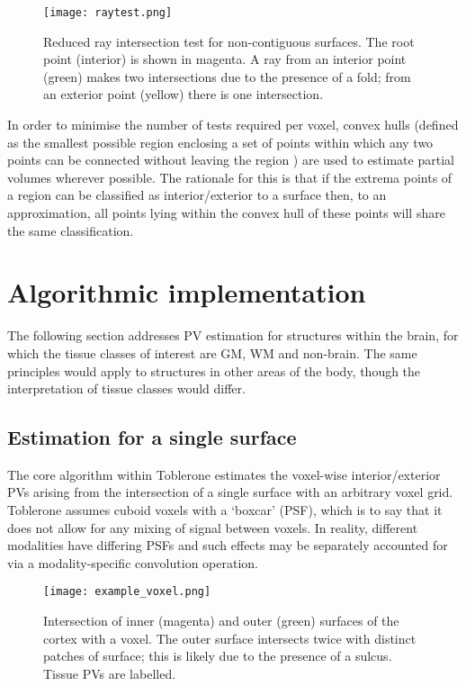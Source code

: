 \begin{figure}
\centering
\texttt{[image: raytest.png]}
\caption{Reduced ray intersection test for non-contiguous surfaces. The root point (interior) is shown in magenta. A ray from an interior point (green) makes two intersections due to the presence of a fold; from an exterior point (yellow) there is one intersection.}
\label{raytest}
\end{figure}

In order to minimise the number of tests required per voxel, convex hulls (defined as the smallest possible region enclosing a set of points within which any two points can be connected without leaving the region \cite{DeBerg2008}) are used to estimate partial volumes wherever possible. The rationale for this is that if the extrema points of a region can be classified as interior/exterior to a surface then, to an approximation, all points lying within the convex hull of these points will share the same classification. 

\section{Algorithmic implementation}

The following section addresses PV estimation for structures within the brain, for which the tissue classes of interest are GM, WM and non-brain. The same principles would apply to structures in other areas of the body, though the interpretation of tissue classes would differ. 

\subsection{Estimation for a single surface}

The core algorithm within Toblerone estimates the voxel-wise interior/exterior PVs arising from the intersection of a single surface with an arbitrary voxel grid. Toblerone assumes cuboid voxels with a ‘boxcar’ (PSF), which is to say that it does not allow for any mixing of signal between voxels. In reality, different modalities have differing PSFs and such effects may be separately accounted for via a modality-specific convolution operation. 

\begin{figure}
\centering
\texttt{[image: example\_voxel.png]}
\caption{Intersection of inner (magenta) and outer (green) surfaces of the cortex with a voxel. The outer surface intersects twice with distinct patches of surface; this is likely due to the presence of a sulcus. Tissue PVs are labelled.  }
\label{example_voxel}
\end{figure}

